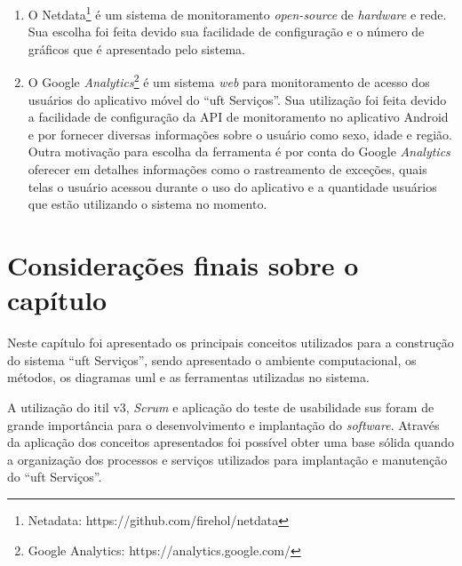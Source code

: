 \begin{enumerate}
    \item O Netdata\footnote{Netadata: https://github.com/firehol/netdata} é um sistema de monitoramento \textit{open-source} de \textit{hardware} e rede. Sua escolha foi feita devido sua facilidade de configuração e o número de gráficos que é apresentado pelo sistema.
    
    \item O Google \textit{Analytics}\footnote{Google Analytics: https://analytics.google.com/} é um sistema \textit{web} para monitoramento de acesso dos usuários do aplicativo móvel do ``\acrshort{uft} Serviços''. Sua utilização foi feita devido a facilidade de configuração da API de monitoramento no aplicativo Android e por fornecer diversas informações sobre o usuário como sexo, idade e região. Outra motivação para escolha da ferramenta é por conta do Google \textit{Analytics} oferecer em detalhes informações como o rastreamento de exceções, quais telas o usuário acessou durante o uso do aplicativo e a quantidade usuários que estão utilizando o sistema no momento.

\end{enumerate}

\section*{Considerações finais sobre o capítulo}

\noindent Neste capítulo foi apresentado os principais conceitos utilizados para a construção do sistema ``\acrshort{uft} Serviços'', sendo apresentado o ambiente computacional, os métodos, os diagramas \acrshort{uml} e as ferramentas utilizadas no sistema.

A utilização do \acrshort{itil} v3, \textit{Scrum} e aplicação do teste de usabilidade  \acrshort{sus} foram de grande importância para o desenvolvimento e implantação do \textit{software}. Através da aplicação dos conceitos apresentados foi possível obter uma base sólida quando a organização dos processos e serviços utilizados para implantação e manutenção do ``\acrshort{uft} Serviços''.